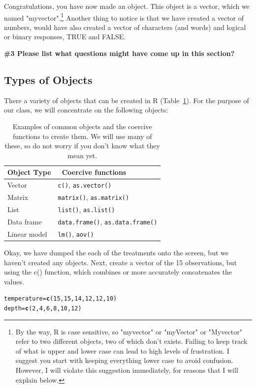 \documentclass{tufte-handout}\usepackage[]{graphicx}\usepackage[]{xcolor}
\makeatletter
\newcommand{\hlnum}[1]{\textcolor[rgb]{0.686,0.059,0.569}{#1}}%
\newcommand{\hlstd}[1]{\textcolor[rgb]{0.345,0.345,0.345}{#1}}%
\newcommand{\hlkwb}[1]{\textcolor[rgb]{0.69,0.353,0.396}{#1}}%
\newcommand{\hlkwd}[1]{\textcolor[rgb]{0.737,0.353,0.396}{\textbf{#1}}}%
\newenvironment{kframe}{%
 \def\at@end@of@kframe{}%
 \ifinner\ifhmode%
  \def\at@end@of@kframe{\end{minipage}}%
  \begin{minipage}{\columnwidth}%
 \fi\fi%
 \def\FrameCommand##1{\hskip\@totalleftmargin \hskip-\fboxsep
 \colorbox{shadecolor}{##1}\hskip-\fboxsep
     \hskip-\linewidth \hskip-\@totalleftmargin \hskip\columnwidth}%
 \MakeFramed {\advance\hsize-\width
   \@totalleftmargin\z@ \linewidth\hsize
   \@setminipage}}%
 {\par\unskip\endMakeFramed%
 \at@end@of@kframe}
\newenvironment{knitrout}{}{} %
\makeatother
\begin{document}
Congratulations, you have now made an object. This object is a vector, which we  named "myvector".\footnote{By the way, R is case sensitive, so "myvector" or "myVector" or "Myvector" refer to two different objects, two of which don't exists. Failing to keep track of what is upper and lower case can lead to high levels of frustration. I suggest you start with keeping everything lower case to avoid confusion. However, I will violate this suggestion immediately, for reasons that I will explain below.} Another thing to notice is that we have created a vector of numbers, would have also created a vector of characters (and words) and logical or binary responses, \ie TRUE and FALSE.

\bigskip
\noindent \textbf{\#3 Please list what questions might have come up in this section? }

\subsection{Types of Objects}

There a variety of objects that can be created in R (Table~\ref{tab:CommonObjects}). For the purpose of our class, we will concentrate on the following objects:
\begin{table}
	\centering
		\begin{tabular}{ll}
Object Type &\ Coercive functions \\
\hline
Vector & \texttt{c()}, \texttt{as.vector()} \\
Matrix & \texttt{matrix()}, \texttt{as.matrix()} \\
List & \texttt{list()}, \texttt{as.list()} \\
Data frame & \texttt{data.frame()}, \texttt{as.data.frame()} \\
Linear model & \texttt{lm()}, \texttt{aov()} \\\hline
		\end{tabular}
	\caption{Examples of common objects and the coercive functions to create them. We will use many of these, so do not worry if you don't know what they mean yet.}
	\label{tab:CommonObjects}
\end{table}



Okay, we have dumped the each of the treatments onto the screen, but we haven't created any objects. Next, create a vector of the 15 observations, but using the c() function, which combines or more accurately concatenates the values. 

\begin{knitrout}
\color{fgcolor}\begin{kframe}
\begin{alltt}
\hlstd{temperature} \hlkwb{=} \hlkwd{c}\hlstd{(}\hlnum{15}\hlstd{,} \hlnum{15}\hlstd{,} \hlnum{14}\hlstd{,} \hlnum{12}\hlstd{,} \hlnum{12}\hlstd{,} \hlnum{10}\hlstd{)}
\hlstd{depth} \hlkwb{=} \hlkwd{c}\hlstd{(}\hlnum{2}\hlstd{,} \hlnum{4}\hlstd{,} \hlnum{6}\hlstd{,} \hlnum{8}\hlstd{,} \hlnum{10}\hlstd{,} \hlnum{12}\hlstd{)}
\end{alltt}
\end{kframe}
\end{knitrout}
\end{document}
